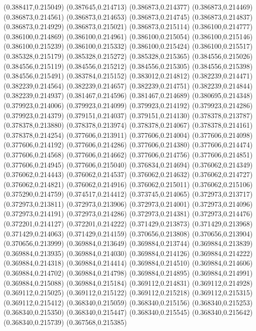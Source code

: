 (0.388417,0.215049)
(0.387645,0.214713)
(0.386873,0.214377)
(0.386873,0.214469)
(0.386873,0.214561)
(0.386873,0.214653)
(0.386873,0.214745)
(0.386873,0.214837)
(0.386873,0.214929)
(0.386873,0.215021)
(0.386873,0.215114)
(0.386100,0.214777)
(0.386100,0.214869)
(0.386100,0.214961)
(0.386100,0.215054)
(0.386100,0.215146)
(0.386100,0.215239)
(0.386100,0.215332)
(0.386100,0.215424)
(0.386100,0.215517)
(0.385328,0.215179)
(0.385328,0.215272)
(0.385328,0.215365)
(0.384556,0.215026)
(0.384556,0.215119)
(0.384556,0.215212)
(0.384556,0.215305)
(0.384556,0.215398)
(0.384556,0.215491)
(0.383784,0.215152)
(0.383012,0.214812)
(0.382239,0.214471)
(0.382239,0.214564)
(0.382239,0.214657)
(0.382239,0.214751)
(0.382239,0.214844)
(0.382239,0.214937)
(0.381467,0.214596)
(0.381467,0.214689)
(0.380695,0.214348)
(0.379923,0.214006)
(0.379923,0.214099)
(0.379923,0.214192)
(0.379923,0.214286)
(0.379923,0.214379)
(0.379151,0.214037)
(0.379151,0.214130)
(0.378378,0.213787)
(0.378378,0.213880)
(0.378378,0.213974)
(0.378378,0.214067)
(0.378378,0.214161)
(0.378378,0.214254)
(0.377606,0.213911)
(0.377606,0.214004)
(0.377606,0.214098)
(0.377606,0.214192)
(0.377606,0.214286)
(0.377606,0.214380)
(0.377606,0.214474)
(0.377606,0.214568)
(0.377606,0.214662)
(0.377606,0.214756)
(0.377606,0.214851)
(0.377606,0.214945)
(0.377606,0.215040)
(0.376834,0.214694)
(0.376062,0.214349)
(0.376062,0.214443)
(0.376062,0.214537)
(0.376062,0.214632)
(0.376062,0.214727)
(0.376062,0.214821)
(0.376062,0.214916)
(0.376062,0.215011)
(0.376062,0.215106)
(0.375290,0.214759)
(0.374517,0.214412)
(0.373745,0.214065)
(0.372973,0.213717)
(0.372973,0.213811)
(0.372973,0.213906)
(0.372973,0.214001)
(0.372973,0.214096)
(0.372973,0.214191)
(0.372973,0.214286)
(0.372973,0.214381)
(0.372973,0.214476)
(0.372201,0.214127)
(0.372201,0.214222)
(0.371429,0.213873)
(0.371429,0.213968)
(0.371429,0.214063)
(0.371429,0.214159)
(0.370656,0.213808)
(0.370656,0.213904)
(0.370656,0.213999)
(0.369884,0.213649)
(0.369884,0.213744)
(0.369884,0.213839)
(0.369884,0.213935)
(0.369884,0.214030)
(0.369884,0.214126)
(0.369884,0.214222)
(0.369884,0.214318)
(0.369884,0.214414)
(0.369884,0.214510)
(0.369884,0.214606)
(0.369884,0.214702)
(0.369884,0.214798)
(0.369884,0.214895)
(0.369884,0.214991)
(0.369884,0.215088)
(0.369884,0.215184)
(0.369112,0.214831)
(0.369112,0.214928)
(0.369112,0.215025)
(0.369112,0.215122)
(0.369112,0.215218)
(0.369112,0.215315)
(0.369112,0.215412)
(0.368340,0.215059)
(0.368340,0.215156)
(0.368340,0.215253)
(0.368340,0.215350)
(0.368340,0.215447)
(0.368340,0.215545)
(0.368340,0.215642)
(0.368340,0.215739)
(0.367568,0.215385)

